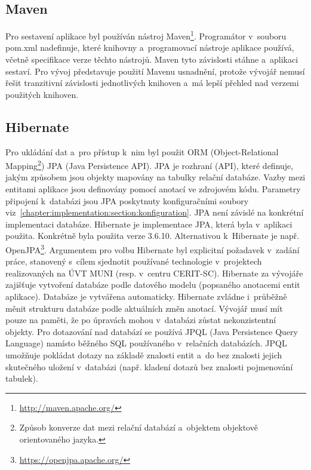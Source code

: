 \documentclass[11pt, draft, oneside]{fithesis2}
\begin{document}
\subsection{Maven}
Pro sestavení aplikace byl používán nástroj Maven\footnote{\url{http://maven.apache.org/}}. Programátor v~souboru pom.xml nadefinuje, které knihovny a~programovací nástroje aplikace používá, včetně specifikace verze těchto nástrojů. Maven tyto závislosti stáhne a~aplikaci sestaví. Pro vývoj představuje použití Mavenu usnadnění, protože vývojář nemusí řešit tranzitivní závislosti jednotlivých knihoven a~má lepší přehled nad verzemi použitých knihoven. 

\subsection{Hibernate}
Pro ukládání dat a~pro přístup k~nim byl použit ORM (Object-Relational Mapping\footnote{Způsob konverze dat mezi relační databází a~objektem objektově orientovaného jazyka.}) JPA (Java Persistence API). JPA je rozhraní (API), které definuje, jakým způsobem jsou objekty mapovány na tabulky relační databáze. Vazby mezi entitami aplikace jsou definovány pomocí anotací ve zdrojovém kódu. Parametry připojení k~databázi jsou JPA poskytnuty konfiguračními soubory viz~\ref{chapter:implementation:section:konfiguration}. JPA není závislé na konkrétní implementaci databáze.
Hibernate je implementace JPA, která byla v~aplikaci použita. Konkrétně byla použita verze 3.6.10. Alternativou k~Hibernate je např. OpenJPA\footnote{\url{https://openjpa.apache.org/}}. Argumentem pro volbu Hibernate byl explicitní požadavek v~zadání práce, stanovený s~cílem sjednotit používané technologie v~projektech realizovaných na ÚVT MUNI (resp. v~centru CERIT-SC). 
Hibernate za vývojáře zajišťuje vytvoření databáze podle datového modelu (popsaného anotacemi entit aplikace). Databáze je vytvářena automaticky. Hibernate zvládne i~průběžně měnit strukturu databáze podle aktuálních změn anotací. Vývojář musí mít pouze na paměti, že po úpravách mohou v~databázi zůstat nekonzistentní objekty.
Pro dotazování nad databází se používá JPQL (Java Persistence Query Language) namísto běžného SQL používaného v~relačních databázích. JPQL umožňuje pokládat dotazy na základě znalosti entit a~do bez znalosti jejich skutečného uložení v~databázi (např. kladení dotazů bez znalosti pojmenování tabulek).
\end{document}
